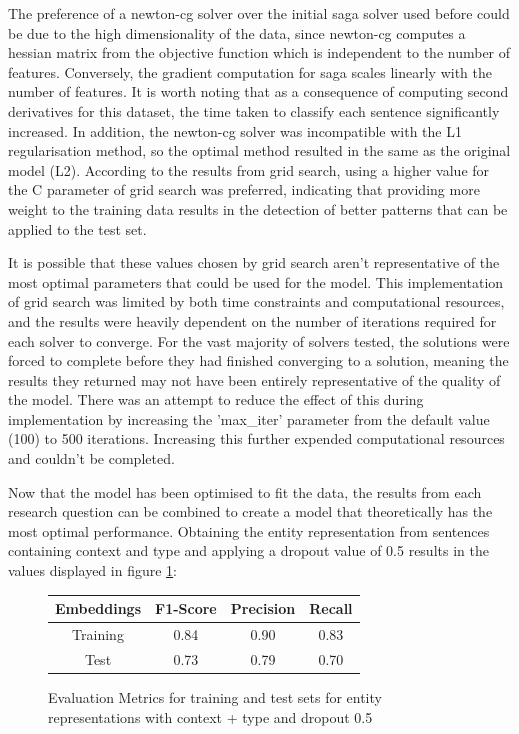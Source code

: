 \documentclass{l4proj}
\begin{document}
The preference of a newton-cg solver over the initial saga solver used before could be due to the high dimensionality of the data, since newton-cg computes a hessian matrix from the objective function which is independent to the number of features. Conversely, the gradient computation for saga scales linearly with the number of features. It is worth noting that as a consequence of computing second derivatives for this dataset, the time taken to classify each sentence significantly increased. In addition, the newton-cg solver was incompatible with the L1 regularisation method, so the optimal method resulted in the same as the original model (L2). According to the results from grid search, using a higher value for the C parameter of grid search was preferred, indicating that providing more weight to the training data results in the detection of better patterns that can be applied to the test set.

It is possible that these values chosen by grid search aren't representative of the most optimal parameters that could be used for the model. This implementation of grid search was limited by both time constraints and computational resources, and the results were heavily dependent on the number of iterations required for each solver to converge. For the vast majority of solvers tested, the solutions were forced to complete before they had finished converging to a solution, meaning the results they returned may not have been entirely representative of the quality of the model. There was an attempt to reduce the effect of this during implementation by increasing the 'max\_iter' parameter from the default value (100) to 500 iterations. Increasing this further expended computational resources and couldn't be completed.

Now that the model has been optimised to fit the data, the results from each research question can be combined to create a model that theoretically has the most optimal performance. Obtaining the entity representation from sentences containing context and type and applying a dropout value of 0.5 results in the values displayed in figure \ref{fig:best}:

\begin{figure}[h]
\begin{center}
\begin{tabular}{||c c c c||} 
 \hline
 Embeddings & F1-Score & Precision & Recall \\ [0.5ex] 
 \hline\hline
 Training & 0.84 & 0.90 & 0.83 \\ 
 \hline
 Test & 0.73 & 0.79 & 0.70\\
 \hline
\end{tabular}
\end{center}
\caption{Evaluation Metrics for training and test sets for entity representations with context + type and dropout 0.5}
\label{fig:best}
\end{figure}
\end{document}
